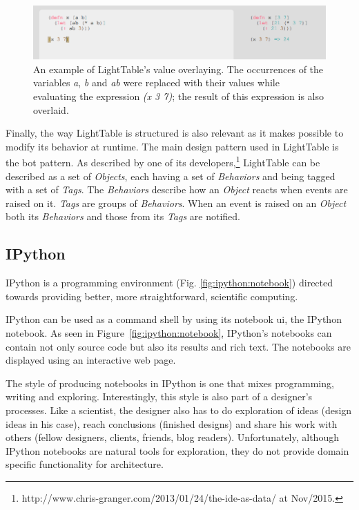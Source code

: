 \begin{figure}
	\centering
	\includegraphics[width=12cm]{./images/lt_val_overlay__inv}
	\caption{An example of LightTable's value overlaying. The occurrences of the variables \emph{a}, \emph{b} and \emph{ab} were replaced with their values while evaluating the expression \emph{(x 3 7)}; the result of this expression is also overlaid.}
	\label{fig:lt:val:overlay}
\end{figure}

Finally, the way LightTable is structured is also relevant as it makes possible to modify its behavior at runtime.
The main design pattern used in LightTable is the \gls{bot} pattern.
As described by one of its developers,\footnote{http://www.chris-granger.com/2013/01/24/the-ide-as-data/ at Nov/2015.} LightTable can be described as a set of \emph{Objects}, each having a set of \emph{Behaviors} and being tagged with a set of \emph{Tags}.
The \emph{Behaviors} describe how an \emph{Object} reacts when events are raised on it. \emph{Tags} are groups of \emph{Behaviors}.
When an event is raised on an \emph{Object} both its \emph{Behaviors} and those from its \emph{Tags} are notified.


\subsection{IPython}
\label{section:ipython:related}
IPython\cite{PER-GRA:2007} is a programming environment (Fig. \ref{fig:ipython:notebook}) directed towards providing better, more straightforward, scientific computing.

IPython can be used as a command shell by using its notebook \gls{ui}, the IPython notebook.
As seen in Figure~\ref{fig:ipython:notebook}, IPython's notebooks can contain not only source code but also its results and rich text.
The notebooks are displayed using an interactive web page.

The style of producing notebooks in IPython is one that mixes programming, writing and exploring.
Interestingly, this style is also part of a designer's processes.
Like a scientist, the designer also has to do exploration of ideas (design ideas in his case), reach conclusions (finished designs) and share his work with others (fellow designers, clients, friends, blog readers).
Unfortunately, although IPython notebooks are natural tools for exploration, they do not provide domain specific functionality for architecture.

